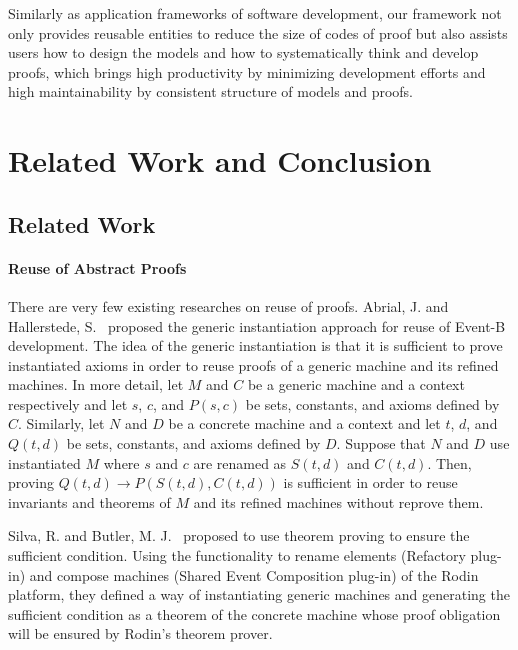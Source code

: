 \documentclass[12pt]{report}
\newcommand{\ra}{\rightarrow}
\begin{document}
Similarly as application frameworks of software development, our
framework not only provides reusable entities to reduce the size of
codes of proof but also assists users how to design the models and how
to systematically think and develop proofs, which brings high
productivity by minimizing development efforts and high
maintainability by consistent structure of models and proofs.

\chapter{Related Work and Conclusion}
\label{chap:conclusion}
\section{Related Work}
\subsubsection{Reuse of Abstract Proofs}
There are very few existing researches on reuse of proofs.  Abrial,
J. and Hallerstede, S.~\cite{AbrialH07} proposed the generic
instantiation approach for reuse of Event-B development.  The idea of
the generic instantiation is that it is sufficient to prove
instantiated axioms in order to reuse proofs of a generic machine and
its refined machines. In more detail, let $M$ and $C$ be a generic
machine and a context respectively and let $s$, $c$, and $P(s,c)$ be
sets, constants, and axioms defined by $C$.  Similarly, let $N$ and
$D$ be a concrete machine and a context and let $t$, $d$, and $Q(t,d)$
be sets, constants, and axioms defined by $D$. Suppose that $N$ and
$D$ use instantiated $M$ where $s$ and $c$ are renamed as $S(t,d)$ and
$C(t,d)$. Then, proving $Q(t,d) \ra P(S(t,d),C(t,d))$ is sufficient in
order to reuse invariants and theorems of $M$ and its refined machines
without reprove them.

Silva, R.  and Butler, M. J.~\cite{SilvaB09} proposed to use theorem
proving to ensure the sufficient condition. Using the functionality to
rename elements (Refactory plug-in) and compose machines (Shared Event
Composition plug-in) of the Rodin platform, they defined a way of
instantiating generic machines and generating the sufficient condition
as a theorem of the concrete machine whose proof obligation will be
ensured by Rodin's theorem prover.
\end{document}
